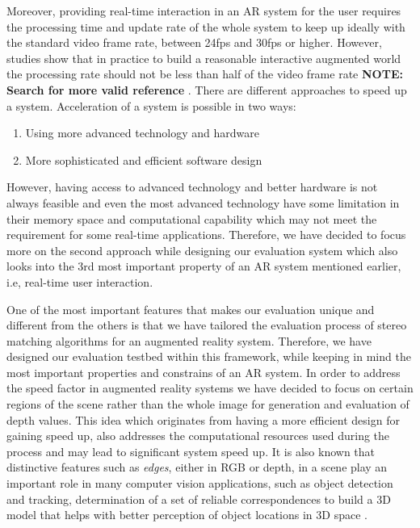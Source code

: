 \documentclass[dvips,letterpaper,12pt]{report}
\begin{document}
Moreover, providing real-time interaction in an AR system for the user requires the processing time and update rate of the whole system to keep up ideally with the standard video frame rate, 
between 24fps and 
30fps or higher. However, studies show that in practice to build a reasonable interactive augmented world the processing rate should not be less than half of the video frame rate  \textbf{NOTE: Search for more
valid reference} \cite{spe}. 
There are different approaches to speed up a system. Acceleration of a system is possible in two ways:
\begin{enumerate}
\item Using more advanced technology and hardware
\item More sophisticated and efficient software design
\end{enumerate}
However, having access to advanced technology and better hardware is not always feasible and even the most advanced technology have some limitation in their memory space and computational capability
which may not meet the requirement for some real-time applications. 
Therefore, we have decided to focus more on the second approach while designing our evaluation system which also looks into the 3rd most important property of
an AR system mentioned earlier, i.e, real-time user interaction. \newline 

One of the most important features that makes our evaluation unique and different from the others is that we have tailored the evaluation process of stereo matching algorithms for an augmented 
reality system. Therefore, we have designed our evaluation testbed within this framework, while keeping in mind the most important properties and constrains of an AR system.
In order to address the speed factor in augmented reality systems we have decided to focus on certain regions of the scene rather than the whole image for generation and evaluation of 
depth values.  
This idea which originates from having a more efficient design for gaining speed up, 
also addresses the computational resources used during the process and may lead to significant system speed up.
It is also known that distinctive features such as {\it edges}, either in RGB or depth, in a scene play an important role in many computer vision applications, such as object detection and 
tracking, determination of a set of reliable correspondences to build a 3D model that helps with better perception of object locations in 3D space \cite{sze11}.
\end{document}
